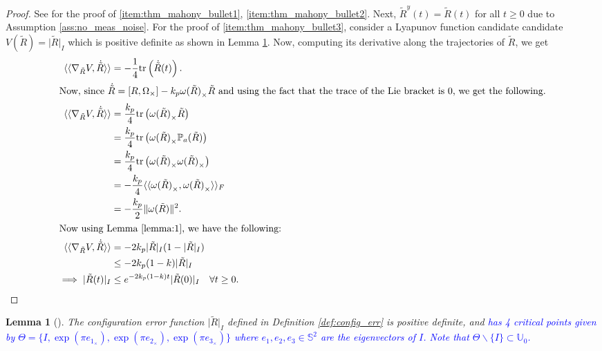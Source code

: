\documentclass{article}
\newtheorem{lemma}{Lemma}
\newcommand{\trace}[1]{\text{tr}\left(#1\right)}
\newcommand{\textblue}[1]{\textcolor{blue}{#1}}
\newcommand{\Rtilde}{\tilde{R}}
\newcommand{\normSOthree}[1]{{{\vert}#1 {\vert}_I}}
\newcommand{\expo}[1]{e^{#1}}
\newcommand{\frobenius}[2]{\langle\langle #1, #2\rangle\rangle_F}
\newcommand{\dualpairing}[2]{\langle\langle #1 , #2 \rangle\rangle}
\newcommand{\grad}[2]{\nabla_{#1}{#2}}
\begin{document}
\begin{proof}
    See {\cite[Theorem 4.2]{mahony_complementaryFilter}} for the proof of \ref{item:thm_mahony_bullet1}, \ref{item:thm_mahony_bullet2}. Next, $\Rtilde^y(t) = \Rtilde(t)$ for all $t\geq 0$ due to Assumption \ref{ass:no_meas_noise}. For the proof of \ref{item:thm_mahony_bullet3}, consider a Lyapunov function candidate candidate $V(\Rtilde) = \normSOthree{\Rtilde}$ which is positive definite as shown in Lemma \ref{lemma:lyapfunc}. Now, computing its derivative along the trajectories of $\Rtilde$, we get 
    \begin{align*}
        \dualpairing{\grad{\Rtilde}{V}}{\dot{\Rtilde}} &= -\frac{1}{4}\trace{\dot{\Rtilde}(t)}.\\
        \intertext{Now, since $\dot{\Rtilde} = [R, \Omega_\times] - k_p{\omega(\Rtilde)}_\times\Rtilde$ and using the fact that the trace of the Lie bracket is $0$, we get the following.}
        \dualpairing{\grad{\Rtilde}{V}}{\dot{\Rtilde}} &= \frac{k_p}{4}\trace{{{\omega(\Rtilde)}_\times}\Rtilde}\\
        &= \frac{k_p}{4}\trace{{\omega(\Rtilde)}_\times \mathbb{P}_a{(\Rtilde)}}\\
        &= \frac{k_p}{4}\trace{{\omega(\Rtilde)}_\times {\omega(\Rtilde)}_\times}\\
        &= -\frac{k_p}{4}\frobenius{{\omega(\Rtilde)}_\times}{{\omega(\Rtilde)}_\times}\\
        &= -\frac{k_p}{2}\|\omega(\Rtilde)\|^2.\\
        \intertext{Now using Lemma \ref{lemma:1}, we have the following:}
        \dualpairing{\grad{\Rtilde}{V}}{\dot{\Rtilde}}  &= -2k_p\normSOthree{\Rtilde}(1-\normSOthree{\Rtilde})\\
        &\leq -2k_p(1-k)\normSOthree{\Rtilde}\\ 
        \implies \normSOthree{\Rtilde(t)} &\leq \expo{-2k_p(1-k)t}\normSOthree{\Rtilde(0)} \quad \forall t\geq 0.
    \end{align*}
\end{proof}

\begin{lemma}[\textblue{{\cite[Lemma 5.6]{Chillingworth}}}] \label{lemma:lyapfunc}
    The configuration error function $\normSOthree{\Rtilde}$ defined in Definition \ref{def:config_err} is positive definite, and \textblue{has 4 critical points given by $\Theta =  \{I, \exp(\pi e_{1_{\times}}),  \exp(\pi e_{2_{\times}}), \exp(\pi e_{3_{\times}})\}$ where $e_1, e_2, e_3 \in \mathbb{S}^2$ are the eigenvectors of $I$. Note that $\Theta\backslash\{I\}\subset \mathbb{U}_0$. }
\end{lemma}
\end{document}
